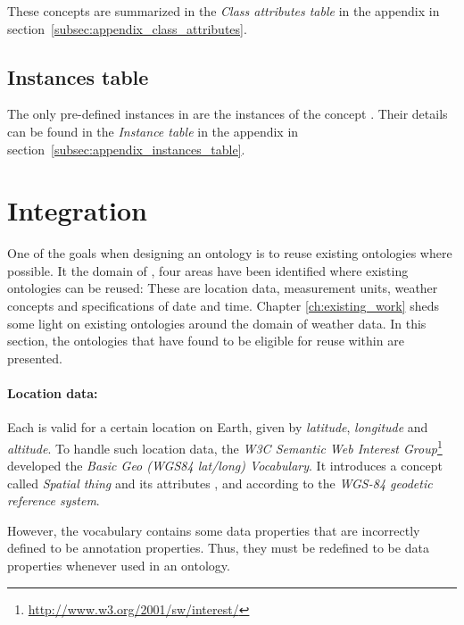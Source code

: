These concepts are summarized in the \emph{Class attributes table} in the appendix in section~\ref{subsec:appendix_class_attributes}.

\subsection{Instances table}
\label{subsec:instances_table}

The only pre-defined instances in \thinkhomeweather are the instances of the concept . Their details can be found in the \emph{Instance table} in the appendix in section~\ref{subsec:appendix_instances_table}.

\section{Integration}
\label{sec:integration}

One of the goals when designing an ontology is to reuse existing ontologies where possible\cite{reuse1}\cite{reuse2}. It the domain of \thinkhomeweather, four areas have been identified where existing ontologies can be reused: These are location data, measurement units, weather concepts and specifications of date and time. Chapter \ref{ch:existing_work} sheds some light on existing ontologies around the domain of weather data. In this section, the ontologies that have found to be eligible for reuse within \thinkhomeweather are presented.

\paragraph{Location data:}

Each  is valid for a certain location on Earth, given by \emph{latitude}, \emph{longitude} and \emph{altitude}. To handle such location data, the \emph{W3C Semantic Web Interest Group}\footnote{\href{http://www.w3.org/2001/sw/interest/}{http://www.w3.org/2001/sw/interest/}} developed the \emph{Basic Geo (WGS84 lat/long) Vocabulary}\cite{wgs84_vocabulary}. It introduces a concept called \emph{Spatial thing} and its attributes ,  and  according to the \emph{WGS-84 geodetic reference system}\cite{WGS84}.

However, the vocabulary contains some data properties that are incorrectly defined to be annotation properties. Thus, they must be redefined to be data properties whenever used in an ontology.

